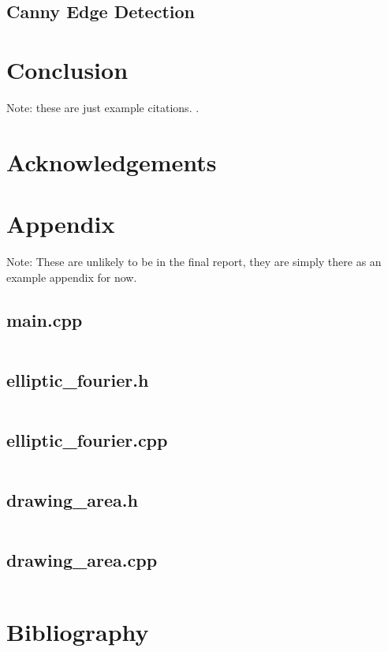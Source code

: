 \documentclass[12pt,english]{article}
\begin{document}
\subsection{Canny Edge Detection}

\section{Conclusion}
Note: these are just example citations.
\cite[p. 150]{nixon:2019}
\cite{thompson:1961}
\cite{lestrel:1997}
\cite{cartwright:1990}
\cite{dryden:2016}
.

\section{Acknowledgements}

\section{Appendix}
Note: These are unlikely to be in the final report, they are simply there as an example appendix for now.
\subsection*{main.cpp}
\inputminted[breakanywhere=true]{cpp}{../code/elliptic_fourier/main.cpp}
\subsection*{elliptic\_fourier.h}
\inputminted[breakanywhere=true]{cpp}{../code/elliptic_fourier/elliptic_fourier.h}
\subsection*{elliptic\_fourier.cpp}
\inputminted[breakanywhere=true]{cpp}{../code/elliptic_fourier/elliptic_fourier.cpp}
\subsection*{drawing\_area.h}
\inputminted[breakanywhere=true]{cpp}{../code/elliptic_fourier/drawing_area.h}
\subsection*{drawing\_area.cpp}
\inputminted[breakanywhere=true]{cpp}{../code/elliptic_fourier/drawing_area.cpp}

\section{Bibliography}


\end{document}
